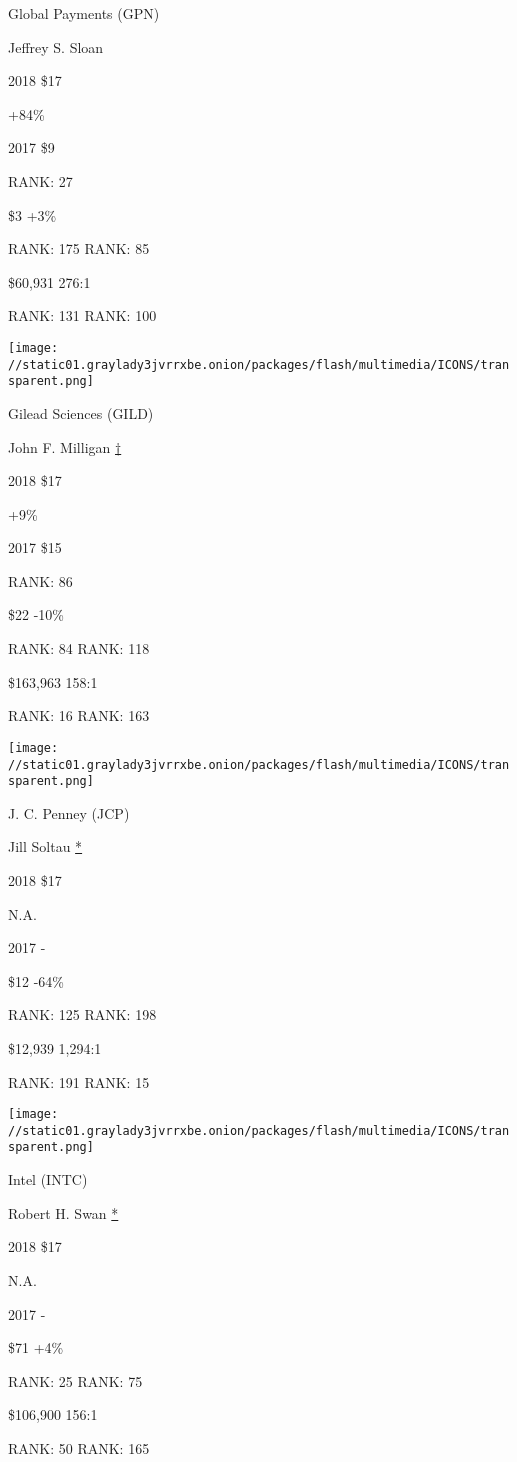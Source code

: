 Global Payments (GPN)

Jeffrey S. Sloan \protect\hyperlink{g-footnotes}{}

2018 \$17

 +84\%

2017 \$9

RANK: 27

 \$3 +3\%

RANK: 175 RANK: 85

 \$60,931 276:1

RANK: 131 RANK: 100

\texttt{[image: //static01.graylady3jvrrxbe.onion/packages/flash/multimedia/ICONS/transparent.png]}

Gilead Sciences (GILD)

John F. Milligan \protect\hyperlink{g-footnotes}{†}

2018 \$17

 +9\%

2017 \$15

RANK: 86

 \$22 -10\%

RANK: 84 RANK: 118

 \$163,963 158:1

RANK: 16 RANK: 163

\texttt{[image: //static01.graylady3jvrrxbe.onion/packages/flash/multimedia/ICONS/transparent.png]}

J. C. Penney (JCP)

Jill Soltau \protect\hyperlink{g-footnotes}{*}

2018 \$17

 N.A.

2017 -

 \$12 -64\%

RANK: 125 RANK: 198

 \$12,939 1,294:1

RANK: 191 RANK: 15

\texttt{[image: //static01.graylady3jvrrxbe.onion/packages/flash/multimedia/ICONS/transparent.png]}

Intel (INTC)

Robert H. Swan \protect\hyperlink{g-footnotes}{*}

2018 \$17

 N.A.

2017 -

 \$71 +4\%

RANK: 25 RANK: 75

 \$106,900 156:1

RANK: 50 RANK: 165

